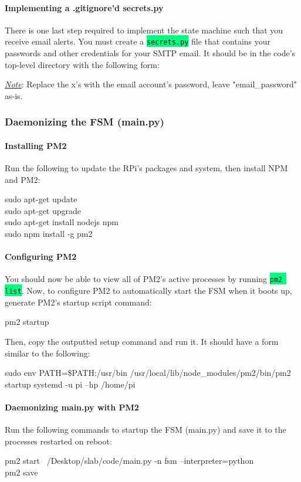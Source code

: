 \documentclass{article}
\newcommand*{\myfont}{\fontfamily{pcr}\selectfont}
\newcommand{\codei}[1]{\colorbox{SpringGreen}{\texttt{#1}}} %
\newcommand{\codeb}[2]{
  \begin{tcolorbox}[width=\textwidth,colback={SpringGreen},title={#1},colbacktitle=darkgreen,coltitle=SpringGreen]
    \myfont
    #2
  \end{tcolorbox}
} %
\newcommand{\outputb}[2]{
  \begin{tcolorbox}[width=\textwidth,colback={light-gray},title={#1},colbacktitle=gray,coltitle=light-gray]
    \myfont
    #2
  \end{tcolorbox}
} %
\newcommand{\note}[1]{\underline{\textit{Note}}: #1}
\begin{document}
    \paragraph{Implementing a .gitignore'd secrets.py}
    There is one last step required to implement the state machine such that you receive email alerts. You must create a \codei{secrets.py} file that contains your passwords and other credentials for your SMTP email. It should be in the code's top-level directory with the following form:
    
    \note{Replace the x's with the email account's password, leave "email_password" as-is.}


  \subsubsection{Daemonizing the FSM (main.py)}
    \paragraph{Installing PM2}
    Run the following to update the RPi's packages and system, then install NPM and PM2:
    \codeb{Update RPi and install NPM and PM2}{
        sudo apt-get update \\
        sudo apt-get upgrade \\
        sudo apt-get install nodejs npm \\
        sudo npm install -g pm2 \\
    }
    \paragraph{Configuring PM2}
    You should now be able to view all of PM2's active processes by running \codei{pm2 list}. Now, to configure PM2 to automatically start the FSM when it boots up, generate PM2's startup script command:
    \codeb{Generate PM2's startup script command}{pm2 startup}
    Then, copy the outputted setup command and run it. It should have a form similar to the following:
    \outputb{Generate PM2's startup script (this is output, DO NOT EXECUTE IT)}{sudo env PATH=\$PATH:/usr/bin /usr/local/lib/node\_modules/pm2/bin/pm2 startup systemd -u pi --hp /home/pi}
    \paragraph{Daemonizing main.py with PM2}
    Run the following commands to startup the FSM (main.py) and save it to the processes restarted on reboot:
    \codeb{Start FSM process; save it to reboot processes}{
        pm2 start ~/Desktop/slab/code/main.py -n fsm --interpreter=python \\
        pm2 save
    }
\end{document}
